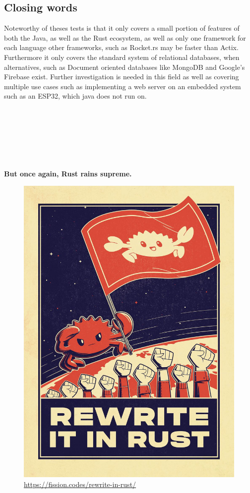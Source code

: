 \documentclass[a4paper,12pt]{article}
\begin{document}
	\subsection*{Closing words}
	\label{subsec:closing_words}
	Noteworthy of theses tests is that it only covers a small portion of features of both the Java, as well as the Rust ecosystem, as well as
	only one framework for each language other frameworks, such as Rocket.rs may be faster than Actix. Furthermore it only covers the
	standard system of relational databases, when alternatives, such as Document oriented databases like MongoDB and Google's Firebase
	exist. Further investigation is needed in this field as well as covering multiple use cases such as implementing a web server on an
	embedded system such as an ESP32, which java does not run on. 
	\\ \\ \\ \\ \\ \\ \\ \\
	\textbf{But once again, Rust rains supreme.}
	\clearpage
	\newpage
	\begin{figure}
		\includegraphics[width=\textwidth]{rewrite_it_in_rust.jpeg}
		\caption{\href{https://fission.codes/rewrite-in-rust/}{https://fission.codes/rewrite-in-rust/}}
	\end{figure}
\end{document}
